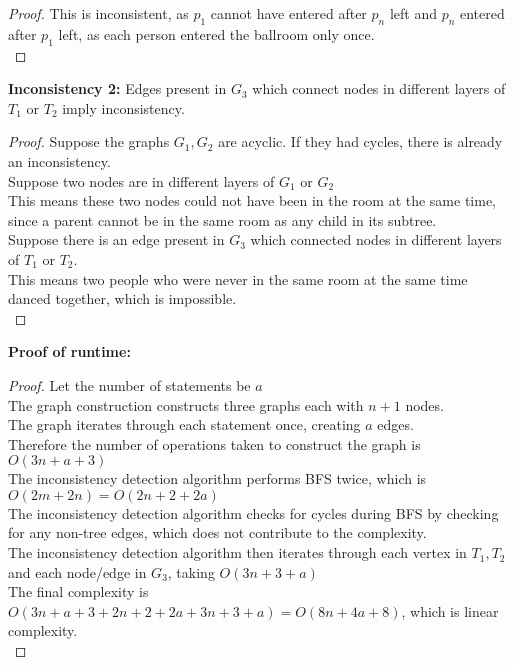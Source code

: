 \begin{problem}
\begin{proof}
    This is inconsistent, as $p_1$ cannot have entered after $p_n$ left and $p_n$ entered after $p_1$ left, as each person entered the ballroom only once. \\
  \end{proof}
  \textbf{Inconsistency 2: } Edges present in $G_3$ which connect nodes in different layers of $T_1$ or $T_2$ imply inconsistency. \\
  \begin{proof}
    Suppose the graphs $G_1, G_2$ are acyclic. If they had cycles, there is already an inconsistency. \\
    Suppose two nodes are in different layers of $G_1$ or $G_2$ \\
    This means these two nodes could not have been in the room at the same time, since a parent cannot be in the same room as any child in its subtree. \\
    Suppose there is an edge present in $G_3$ which connected nodes in different layers of $T_1$ or $T_2$. \\
    This means two people who were never in the same room at the same time danced together, which is impossible. \\
  \end{proof}
  \textbf{Proof of runtime: }
  \begin{proof}
    Let the number of statements be $a$ \\
    The graph construction constructs three graphs each with $n+1$ nodes. \\
    The graph iterates through each statement once, creating $a$ edges. \\
    Therefore the number of operations taken to construct the graph is $O(3n + a + 3)$ \\
    The inconsistency detection algorithm performs BFS twice, which is $O(2m + 2n) = O(2n + 2 + 2a)$ \\
    The inconsistency detection algorithm checks for cycles during BFS by checking for any non-tree edges, which does not contribute to the complexity. \\
    The inconsistency detection algorithm then iterates through each vertex in $T_1, T_2$ and each node/edge in $G_3$, taking $O(3n + 3 + a)$ \\
    The final complexity is $O(3n + a + 3 + 2n + 2 + 2a + 3n + 3 + a) = O(8n + 4a + 8)$, which is linear complexity. \\
  \end{proof}
\end{problem}
